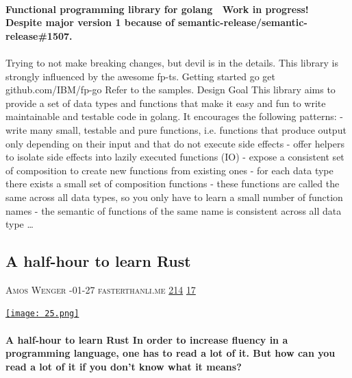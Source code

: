 \documentclass[10pt,a4paper]{article}
\begin{document}
\begin{multicols}{2}
\paragraph{}
\textbf{Functional programming library for golang
🚧 Work in progress! 🚧 Despite major version 1 because of semantic-release/semantic-release\#1507.}
\paragraph{}
 Trying to not make breaking changes, but devil is in the details.
This library is strongly influenced by the awesome fp-ts.
Getting started
go get github.com/IBM/fp-go
Refer to the samples.
Design Goal
This library aims to provide a set of data types and functions that make it easy and fun to write maintainable and testable code in golang. It encourages the following patterns:
- write many small, testable and pure functions, i.e. functions that produce output only depending on their input and that do not execute side effects
- offer helpers to isolate side effects into lazily executed functions (IO)
- expose a consistent set of composition to create new functions from existing ones
- for each data type there exists a small set of composition functions
- these functions are called the same across all data types, so you only have to learn a small number of function names
- the semantic of functions of the same name is consistent across all data type
\dots\par
\noindent\begin{minipage}{\linewidth}
\medskip
\subsection{A half-hour to learn Rust}
\textsc{\footnotesize
{\scriptsize\faUser}\space 
Amos Wenger 
{\scriptsize\faCalendar}-01-27 
{\scriptsize\faGlobe}\space 
fasterthanli.me 
{\scriptsize\faThumbsOUp}\space 
\href{http://news.ycombinator.com/item?id=37236916\&utm\_term=comment}{214} 
{\scriptsize\faComments}\space 
\href{http://news.ycombinator.com/item?id=37236916\&utm\_term=comment}{17} 
}
\par\medskip\noindent
\href{https://fasterthanli.me/articles/a-half-hour-to-learn-rust?utm\_source=hackernewsletter\&utm\_medium=email\&utm\_term=code}{
    \texttt{[image: 25.png]}
}
\end{minipage}
\paragraph{}
\textbf{A half-hour to learn Rust
In order to increase fluency in a programming language, one has to read a lot of it. But how can you read a lot of it if you don't know what it means?}

\end{multicols}
\end{document}
